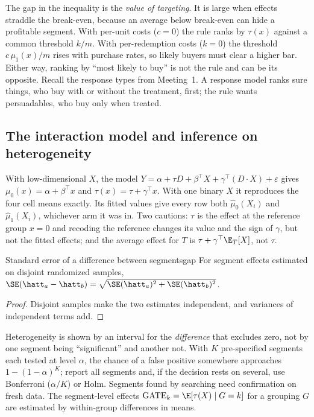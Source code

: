 \documentclass[11pt]{article}
\begin{document}
The gap in the inequality is the \emph{value of targeting}. It is large when effects straddle the break-even,
because an average below break-even can hide a profitable segment. With per-unit costs ($c=0$) the rule ranks by
$\tau(x)$ against a common threshold $k/m$. With per-redemption costs ($k=0$) the threshold $c\,\mu_1(x)/m$
rises with purchase rates, so likely buyers must clear a higher bar. Either way, ranking by ``most likely to
buy'' is not the rule and can be its opposite. Recall the response types from Meeting~1. A response model ranks
sure things, who buy with or without the treatment, first; the rule wants persuadables, who buy only when
treated.

\subsection{The interaction model and inference on heterogeneity}

With low-dimensional $X$, the model $Y = \alpha + \tau D + \beta^\top X + \gamma^\top (D \cdot X) + \varepsilon$ gives
$\mu_0(x) = \alpha + \beta^\top x$ and $\tau(x) = \tau + \gamma^\top x$. With one binary $X$ it reproduces the four
cell means exactly. Its fitted values give every row both $\hat\mu_0(X_i)$ and $\hat\mu_1(X_i)$, whichever arm it
was in. Two cautions: $\tau$ is the effect at the reference group $x=0$ and recoding the reference changes its
value and the sign of $\gamma$, but not the fitted effects; and the average effect for $T$ is
$\tau + \gamma^\top\E_T[X]$, not $\tau$.

\begin{prop}{Standard error of a difference between segments}{gap}
For segment effects estimated on disjoint randomized samples,
$\SE(\hatt_a - \hatt_b) = \sqrt{\SE(\hatt_a)^2 + \SE(\hatt_b)^2}$.
\end{prop}
\begin{proof}
Disjoint samples make the two estimates independent, and variances of independent terms add.
\end{proof}

Heterogeneity is shown by an interval for the \emph{difference} that excludes zero, not by one segment being
``significant'' and another not. With $K$ pre-specified segments each tested at level $\alpha$, the chance of a
false positive somewhere approaches $1 - (1-\alpha)^K$; report all segments and, if the decision rests on
several, use Bonferroni ($\alpha/K$) or Holm. Segments found by searching need confirmation on fresh data. The
segment-level effects $\text{GATE}_k = \E[\tau(X) \mid G=k]$ for a grouping $G$ are estimated by within-group
differences in means.
\end{document}
